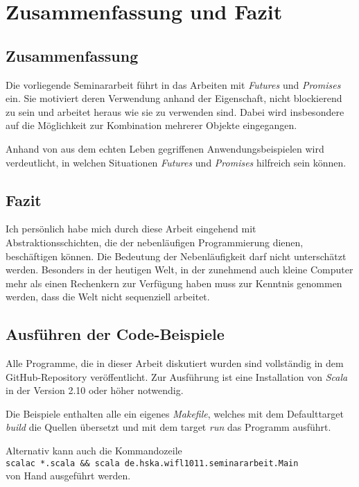 \section{Zusammenfassung und Fazit}

\subsection{Zusammenfassung}

Die vorliegende Seminararbeit führt in das Arbeiten mit \emph{Futures}
und \emph{Promises} ein. Sie motiviert deren Verwendung anhand der
Eigenschaft, nicht blockierend zu sein und arbeitet heraus wie sie
zu verwenden sind. Dabei wird insbesondere auf die Möglichkeit
zur Kombination mehrerer Objekte eingegangen.

Anhand von aus dem echten Leben gegriffenen Anwendungsbeispielen wird
verdeutlicht, in welchen Situationen \emph{Futures} und \emph{Promises}
hilfreich sein können.

\subsection{Fazit}

Ich persönlich habe mich durch diese Arbeit eingehend mit 
Abstraktionsschichten, die der nebenläufigen Programmierung dienen,
beschäftigen können. Die Bedeutung der Nebenläufigkeit darf nicht
unterschätzt werden. Besonders in der heutigen Welt, in der zunehmend
auch kleine Computer mehr als einen Rechenkern zur Verfügung haben
muss zur Kenntnis genommen werden, dass die Welt nicht sequenziell
arbeitet. 

\subsection{Ausführen der Code-Beispiele}

Alle Programme, die in dieser Arbeit diskutiert wurden sind 
vollständig in dem GitHub-Repository \cite{code} veröffentlicht.
Zur Ausführung ist eine Installation von \emph{Scala} in der
Version 2.10 oder höher notwendig.

Die Beispiele enthalten alle ein eigenes \emph{Makefile}, welches
mit dem Defaulttarget \emph{build} die Quellen übersetzt und mit
dem target \emph{run} das Programm ausführt.

Alternativ kann auch die Kommandozeile \\
\texttt{scalac *.scala \&\& scala de.hska.wifl1011.seminararbeit.Main} \\
von Hand ausgeführt werden.

